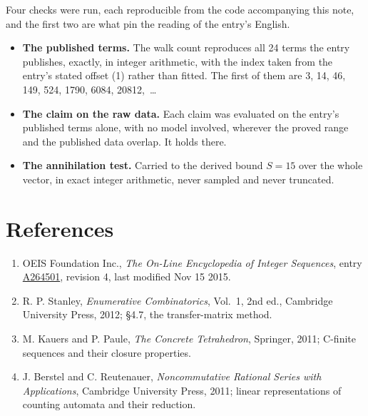 \documentclass[11pt]{article}
\theoremstyle{definition}
\begin{document}
Four checks were run, each reproducible from the code accompanying this note, and the first two are what pin the reading of the entry's English.

\begin{itemize}

\item {\bfseries The published terms.} The walk count reproduces all 24 terms the entry publishes, exactly, in integer arithmetic, with the index taken from the entry's stated offset (1) rather than fitted. The first of them are 3, 14, 46, 149, 524, 1790, 6084, 20812,~\dots

\item {\bfseries The claim on the raw data.} Each claim was evaluated on the entry's published terms alone, with no model involved, wherever the proved range and the published data overlap. It holds there.

\item {\bfseries The annihilation test.} Carried to the derived bound $S = 15$ over the whole vector, in exact integer arithmetic, never sampled and never truncated.

\end{itemize}

\section{References}

\begin{enumerate}

\item OEIS Foundation Inc., \emph{The On-Line Encyclopedia of Integer Sequences}, entry \href{https://oeis.org/A264501}{A264501}, revision 4, last modified Nov 15 2015.

\item R. P. Stanley, \emph{Enumerative Combinatorics}, Vol.~1, 2nd ed., Cambridge University Press, 2012; \S4.7, the transfer-matrix method.

\item M. Kauers and P. Paule, \emph{The Concrete Tetrahedron}, Springer, 2011; C-finite sequences and their closure properties.

\item J. Berstel and C. Reutenauer, \emph{Noncommutative Rational Series with Applications}, Cambridge University Press, 2011; linear representations of counting automata and their reduction.

\end{enumerate}
\end{document}
